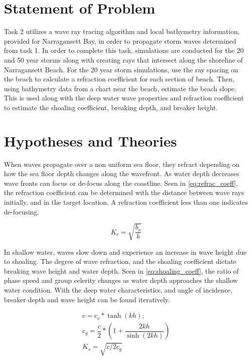 \section{Statement of Problem}
Task 2 utilizes a wave ray tracing algorithm and local bathymetry information, provided for Narragansett Bay, in order to propagate storm waves determined from task 1. In order to complete this task, simulations are conducted for the 20 and 50 year storms along with creating rays that intersect along the shoreline of Narragansett Beach. For the 20 year storm simulations, use the ray spacing on the beach to calculate a refraction coefficient for each section of beach. Then, using bathymetry data from a chart near the beach, estimate the beach slope. This is used along with the deep water wave properties and refraction coefficient to estimate the shoaling coefficient, breaking depth, and breaker height. 
\section{Hypotheses and Theories}

When waves propagate over a non uniform sea floor, they refract depending on how the sea floor depth changes along the wavefront. As water depth decreases wave fronts can focus or de-focus along the coastline. Seen in \ref{eq:refrac_coeff}, the refraction coefficient can be determined with the distance between wave rays initially, and in the target location. A refraction coefficient less than one indicates de-focusing. 

\begin{equation}
K_{r} = \sqrt{\dfrac{b_{o}}{b}}
\label{eq:refrac_coeff}
\end{equation}

In shallow water, waves slow down and experience an increase in wave height due to shoaling. The degree of wave refraction, and the shoaling coefficient dictate breaking wave height and water depth. Seen in \ref{eq:shoaling_coeff}, the ratio of phase speed and group celerity changes as water depth approaches the shallow water condition. With the deep water characteristics, and angle of incidence, breaker depth and wave height can be found iteratively.

\begin{align}[H]
c = c_{o} * \tanh(kh); \\
c_{g} = \dfrac{c}{2} * \left(1 + \dfrac{2kh}{\sinh(2kh)}\right) \\
K_{s} = \sqrt{c/2c_{g}}
\label{eq:shoaling_coeff}
\end{align}

